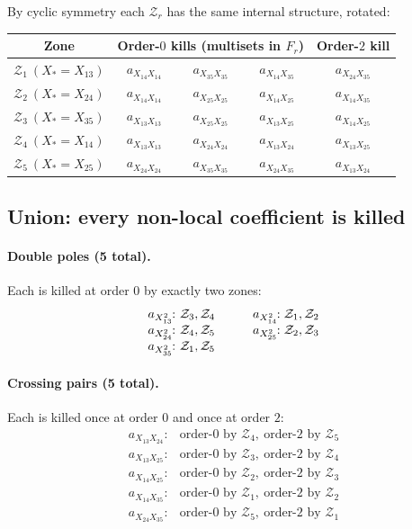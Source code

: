 \documentclass[11pt]{article}
\newcommand{\Zr}{\mathcal{Z}}
\newcommand{\Fr}{F}
\begin{document}
By cyclic symmetry each $\Zr_r$ has the same internal structure, rotated:
\begin{center}\small
\begin{tabular}{c|ccc|c}
Zone & \multicolumn{3}{c|}{Order-$0$ kills (multisets in $\Fr_r$)} & Order-$2$ kill \\ \hline
$\Zr_1\ (X_\ast = X_{13})$ & $a_{X_{14} X_{14}}$ & $a_{X_{35} X_{35}}$ & $a_{X_{14} X_{35}}$ & $a_{X_{24} X_{35}}$ \\
$\Zr_2\ (X_\ast = X_{24})$ & $a_{X_{14} X_{14}}$ & $a_{X_{25} X_{25}}$ & $a_{X_{14} X_{25}}$ & $a_{X_{14} X_{35}}$ \\
$\Zr_3\ (X_\ast = X_{35})$ & $a_{X_{13} X_{13}}$ & $a_{X_{25} X_{25}}$ & $a_{X_{13} X_{25}}$ & $a_{X_{14} X_{25}}$ \\
$\Zr_4\ (X_\ast = X_{14})$ & $a_{X_{13} X_{13}}$ & $a_{X_{24} X_{24}}$ & $a_{X_{13} X_{24}}$ & $a_{X_{13} X_{25}}$ \\
$\Zr_5\ (X_\ast = X_{25})$ & $a_{X_{24} X_{24}}$ & $a_{X_{35} X_{35}}$ & $a_{X_{24} X_{35}}$ & $a_{X_{13} X_{24}}$ \\
\end{tabular}
\end{center}

\subsection{Union: every non-local coefficient is killed}

\paragraph{Double poles (5 total).}
Each is killed at order $0$ by exactly two zones:
\[
\begin{array}{r@{\ }ll}
a_{X_{13}^2}\!\!: & \Zr_3, \Zr_4 &\qquad
a_{X_{14}^2}\!\!: \Zr_1, \Zr_2 \\
a_{X_{24}^2}\!\!: & \Zr_4, \Zr_5 &\qquad
a_{X_{25}^2}\!\!: \Zr_2, \Zr_3 \\
a_{X_{35}^2}\!\!: & \Zr_1, \Zr_5 &
\end{array}
\]

\paragraph{Crossing pairs (5 total).}
Each is killed once at order $0$ and once at order $2$:
\[
\begin{array}{rl}
a_{X_{13} X_{24}}\!\!: & \text{order-$0$ by } \Zr_4,\ \text{order-$2$ by } \Zr_5\\
a_{X_{13} X_{25}}\!\!: & \text{order-$0$ by } \Zr_3,\ \text{order-$2$ by } \Zr_4\\
a_{X_{14} X_{25}}\!\!: & \text{order-$0$ by } \Zr_2,\ \text{order-$2$ by } \Zr_3\\
a_{X_{14} X_{35}}\!\!: & \text{order-$0$ by } \Zr_1,\ \text{order-$2$ by } \Zr_2\\
a_{X_{24} X_{35}}\!\!: & \text{order-$0$ by } \Zr_5,\ \text{order-$2$ by } \Zr_1\\
\end{array}
\]
\end{document}
